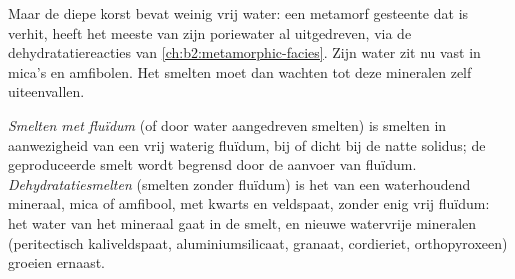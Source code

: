 \begin{omfigure}
\centering
{}
\par{}
\end{omfigure}

Maar de diepe korst bevat weinig vrij water: een metamorf gesteente dat is verhit, heeft het meeste
van zijn poriewater al uitgedreven, via de dehydratatiereacties van
\cref{ch:b2:metamorphic-facies}. Zijn water zit nu vast in mica's en amfibolen. Het smelten
moet dan wachten tot deze mineralen zelf uiteenvallen.

\begin{definition}\label{def:b2:crustal-melting:reactions}
\emph{Smelten met fluïdum} (of door water aangedreven smelten) is
smelten in aanwezigheid van een vrij waterig fluïdum, bij of dicht bij de natte solidus; de geproduceerde
smelt wordt begrensd door de aanvoer van fluïdum. \emph{Dehydratatiesmelten}
(smelten zonder fluïdum) is het  van een waterhoudend mineraal, mica of
amfibool, met kwarts en veldspaat, zonder enig vrij fluïdum: het water van het mineraal
gaat in de smelt, en nieuwe watervrije mineralen (peritectisch kaliveldspaat, aluminiumsilicaat,
granaat, cordieriet, orthopyroxeen) groeien ernaast.
\end{definition}

